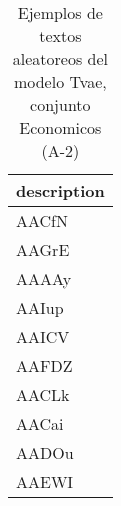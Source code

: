 \begin{table}[H]
\centering
\fontsize{8}{14}\selectfont
\caption{Ejemplos de textos aleatoreos del modelo Tvae, conjunto Economicos (A-2)}
\label{table-sample10-economicos-a-2-tvae-text}
\begin{tabular}{|m{50em}|}
\hline
\rowcolor[gray]{0.8}
description \\
\hline AACfN \\
\hline AAGrE \\
\hline AAAAy \\
\hline AAIup \\
\hline AAICV \\
\hline AAFDZ \\
\hline AACLk \\
\hline AACai \\
\hline AADOu \\
\hline AAEWI \\
\hline
\end{tabular}
\end{table}
